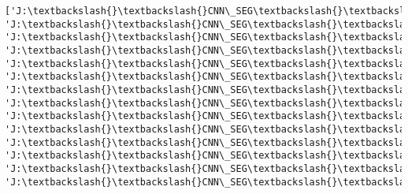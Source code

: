 \documentclass[11pt]{article}
\begin{document}
    \begin{Verbatim}[commandchars=\\\{\}]
['J:\textbackslash{}\textbackslash{}CNN\_SEG\textbackslash{}\textbackslash{}DATA\textbackslash{}\textbackslash{}train\textbackslash{}\textbackslash{}e13s03\_recon', 'J:\textbackslash{}\textbackslash{}CNN\_SEG\textbackslash{}\textbackslash{}DATA\textbackslash{}\textbackslash{}train\textbackslash{}\textbackslash{}e13s04\_recon', 'J:\textbackslash{}\textbackslash{}CNN\_SEG\textbackslash{}\textbackslash{}DATA\textbackslash{}\textbackslash{}train\textbackslash{}\textbackslash{}e13s05\_recon', 'J:\textbackslash{}\textbackslash{}CNN\_SEG\textbackslash{}\textbackslash{}DATA\textbackslash{}\textbackslash{}train\textbackslash{}\textbackslash{}e13s06\_recon', 'J:\textbackslash{}\textbackslash{}CNN\_SEG\textbackslash{}\textbackslash{}DATA\textbackslash{}\textbackslash{}train\textbackslash{}\textbackslash{}e13s08\_recon', 'J:\textbackslash{}\textbackslash{}CNN\_SEG\textbackslash{}\textbackslash{}DATA\textbackslash{}\textbackslash{}train\textbackslash{}\textbackslash{}e13s09\_recon', 'J:\textbackslash{}\textbackslash{}CNN\_SEG\textbackslash{}\textbackslash{}DATA\textbackslash{}\textbackslash{}train\textbackslash{}\textbackslash{}e13s10\_recon', 'J:\textbackslash{}\textbackslash{}CNN\_SEG\textbackslash{}\textbackslash{}DATA\textbackslash{}\textbackslash{}train\textbackslash{}\textbackslash{}e13s11\_recon', 'J:\textbackslash{}\textbackslash{}CNN\_SEG\textbackslash{}\textbackslash{}DATA\textbackslash{}\textbackslash{}train\textbackslash{}\textbackslash{}e13s13\_recon', 'J:\textbackslash{}\textbackslash{}CNN\_SEG\textbackslash{}\textbackslash{}DATA\textbackslash{}\textbackslash{}train\textbackslash{}\textbackslash{}e13s14\_recon', 'J:\textbackslash{}\textbackslash{}CNN\_SEG\textbackslash{}\textbackslash{}DATA\textbackslash{}\textbackslash{}train\textbackslash{}\textbackslash{}e13s15\_recon', 'J:\textbackslash{}\textbackslash{}CNN\_SEG\textbackslash{}\textbackslash{}DATA\textbackslash{}\textbackslash{}train\textbackslash{}\textbackslash{}e13s17\_recon', 'J:\textbackslash{}\textbackslash{}CNN\_SEG\textbackslash{}\textbackslash{}DATA\textbackslash{}\textbackslash{}train\textbackslash{}\textbackslash{}e13s18\_recon', 'J:\textbackslash{}\textbackslash{}CNN\_SEG\textbackslash{}\textbackslash{}DATA\textbackslash{}\textbackslash{}train\textbackslash{}\textbackslash{}e13s19\_recon']

\end{Verbatim}
\end{document}
